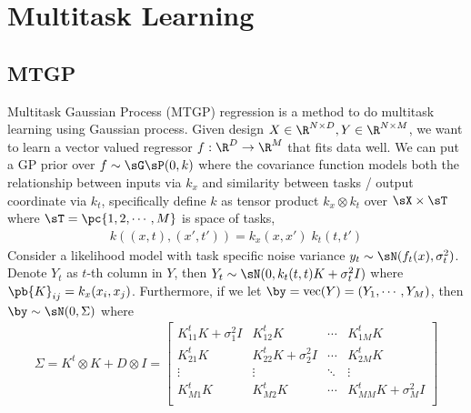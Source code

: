 \documentclass[11pt]{article}
\begin{document}
\section{Multitask Learning}

\subsection{MTGP}

Multitask Gaussian Process (MTGP) regression \cite{bonillaMultitaskGaussianProcess2008} is a method to do multitask learning using Gaussian process. Given design $X\in\R^{N\times D}, Y\in\R^{N\times M}$, we want to learn a vector valued regressor $f:\R^D\to\R^M$ that fits data well. We can put a GP prior over $f \sim \sG\sP(0,k)$ where the covariance function models both the relationship between inputs via $k_x$ and similarity between tasks / output coordinate via $k_t$, specifically define $k$ as tensor product $k_x\otimes k_t$ over $\sX\times\sT$ where $\sT = \pc{1,2,\cdots,M}$ is space of tasks,
\begin{align}
    k((x,t),(x',t')) = k_x(x,x')\; k_t(t,t')
\end{align}
Consider a likelihood model with task specific noise variance $y_t \sim \sN( f_t(x), \sigma_t^2 )$. Denote $Y_t$ as $t$-th column in $Y$, then $Y_t \sim \sN( 0,  k_t(t,t) K + \sigma_t^2 I )$ where $\pb{K}_{ij} = k_x(x_i,x_j)$. Furthermore, if we let $\by = \text{vec}(Y) = (Y_1,\cdots,Y_M)$, then $\by \sim \sN(0,\Sigma)$ where
\begin{align}
    \Sigma = 
    K^t \otimes K + D \otimes I
    = 
    \begin{bmatrix}
        K^t_{11} K + \sigma_1^2 I & K^t_{12} K & \cdots & K^t_{1M} K \\ 
        K^t_{21} K & K^t_{22}K + \sigma_2^2 I & \cdots & K^t_{2M} K \\ 
        \vdots & \vdots & \ddots & \vdots \\
        K^t_{M1} K & K^t_{M2}K  & \cdots & K^t_{MM} K + \sigma_M^2 I \\
    \end{bmatrix}
\end{align}
\end{document}
